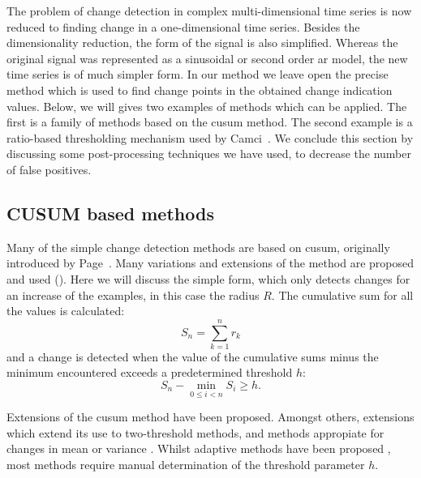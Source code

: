 The problem of change detection in complex multi-dimensional time series is now reduced to finding change in a one-dimensional time series.
Besides the dimensionality reduction, the form of the signal is also simplified.
Whereas the original signal was represented as a sinusoidal or second order \gls{ar} model, the new time series is of much simpler form.
In our method we leave open the precise method which is used to find change points in the obtained change indication values.
Below, we will gives two examples of methods which can be applied.
The first is a family of methods based on the \gls{cusum} method.
The second example is a ratio-based thresholding mechanism used by Camci~\cite{camci2010change}.
We conclude this section by discussing some post-processing techniques we have used, to decrease the number of false positives.

\subsection{CUSUM based methods}
Many of the simple change detection methods are based on \gls{cusum}, originally introduced by Page~\cite{page1954continuous}.
Many variations and extensions of the method are proposed and used (\cite{inclan1994use,alippi2006adaptive,hsu2007mosum}).
Here we will discuss the simple form, which only detects changes for an increase of the examples, in this case the radius $R$.
The cumulative sum for all the values is calculated:
\begin{equation}
  S_n = \sum_{k=1}^n r_k
\end{equation}
and a change is detected when the value of the cumulative sums minus the minimum encountered exceeds a predetermined threshold $h$:
\begin{equation}
  S_n - \operatorname*{min}_{0 \le i < n} S_i \ge h.
\end{equation}

Extensions of the \gls{cusum} method have been proposed.
Amongst others, extensions which extend its use to two-threshold methods, and methods appropiate for changes in mean or variance \cite{inclan1994use}.
Whilst adaptive methods have been proposed \cite{alippi2006adaptive}, most methods require manual determination of the threshold parameter $h$.


